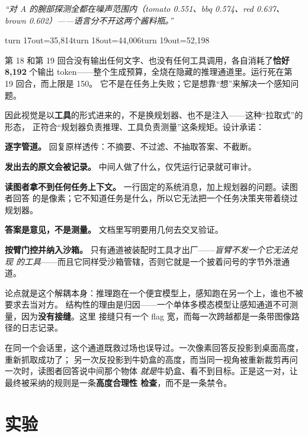 \documentclass[11pt,a4paper,UTF8,fontset=macnew]{ctexrep}
\newcommand{\keyrule}[1]{\textbf{\textcolor{acc}{#1}}}
\begin{document}
\begin{evidence}[title={盲态会话，第 16 回合，然后是第 18--19 回合}]
\small\emph{“对 A 的腕部探测全都在噪声范围内（tomato 0.551、bbq 0.574、red 0.637、
brown 0.602）——语言分不开这两个酱料瓶。”}

\medskip\ttfamily\footnotesize
turn 17\quad out=35{,}814\qquad turn 18\quad out=44{,}006\qquad turn 19\quad out=52{,}198
\end{evidence}

\noindent
第 18 和第 19 回合没有输出任何文字、也没有任何工具调用，各自消耗了\textbf{恰好 8{,}192}
个输出 token——整个生成预算，全烧在隐藏的推理通道里。运行死在第 19 回合，而上限是 150。
它不是在任务上失败；它是想靠“想”来解决一个感知问题。

因此视觉是以\textbf{工具}的形式进来的，不是换规划器、也不是注入——这种“拉取式”的形态，
正符合“规划器负责推理、工具负责测量”这条规矩。设计承诺：

\keyrule{逐字管道。} 回复原样透传：不摘要、不过滤、不抽取答案、不截断。

\keyrule{发出去的原文会被记录。} 中间人做了什么，仅凭运行记录就可审计。

\keyrule{读图者拿不到任何任务上下文。} 一行固定的系统消息，加上规划器的问题。读图者回答
的是像素；它不知道任务是什么，所以它无法把一个任务决策夹带着绕过规划器。

\keyrule{答案是意见，不是测量。} 文档里写明要用几何去交叉验证。

\keyrule{按臂门控并纳入沙箱。} 只有通道被装配时工具才出厂——\emph{盲臂不发一个它无法兑现
的工具}——而且它同样受沙箱管辖，否则它就是一个披着问号的字节外泄通道。

论点就是这个解耦本身：推理跑在一个便宜模型上，感知跑在另一个上，谁也不被要求去当对方。
结构性的理由是归因——一个单体多模态模型让感知通道不可测量，因为\textbf{没有接缝}。这里
接缝只有一个 flag 宽，而每一次跨越都是一条带图像路径的日志记录。

在同一个会话里，这个通道既救过场也误导过。一次像素回答反投影到桌面高度，重新抓取成功了；
另一次反投影到牛奶盒的高度，而当同一视角被重新裁剪再问一次时，读图者回答说中间那个物体
\emph{就是}牛奶盒、看不到目标。正是这一对，让最终被采纳的规则是一条\textbf{高度合理性
检查}，而不是一条禁令。

\chapter{实验}
\label{ch:exp}
\end{document}
